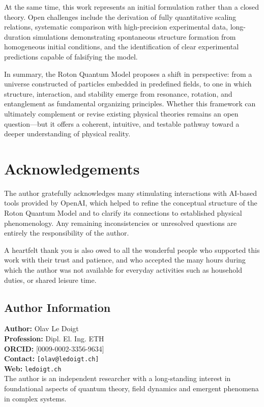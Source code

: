 \documentclass[11pt,a4paper]{article}
\begin{document}
At the same time, this work represents an initial formulation rather than a closed theory. Open challenges include the derivation of fully quantitative scaling relations, systematic comparison with high-precision experimental data, long-duration simulations demonstrating spontaneous structure formation from homogeneous initial conditions, and the identification of clear experimental predictions capable of falsifying the model.

In summary, the Roton Quantum Model proposes a shift in perspective: from a universe constructed of particles embedded in predefined fields, to one in which structure, interaction, and stability emerge from resonance, rotation, and entanglement as fundamental organizing principles. Whether this framework can ultimately complement or revise existing physical theories remains an open question—but it offers a coherent, intuitive, and testable pathway toward a deeper understanding of physical reality.


\section*{Acknowledgements}

The author gratefully acknowledges many stimulating interactions with AI-based tools provided by OpenAI, which helped to refine the conceptual structure of the Roton Quantum Model and to clarify its connections to established physical phenomenology. Any remaining inconsistencies or unresolved questions are entirely the responsibility of the author. 

A heartfelt thank you is also owed to all the wonderful people who supported this work with their trust and patience, and who accepted the many hours during which the author was not available for everyday activities such as household duties, or shared leisure time.

\subsection*{Author Information}
\textbf{Author:} Olav Le Doigt \\
\textbf{Profession:} Dipl. El. Ing. ETH\\
\textbf{ORCID:} [0009-0002-3356-9634] \\
\textbf{Contact:} \texttt{[olav@ledoigt.ch]} \\
\textbf{Web:} \texttt{ledoigt.ch} \\[0.5em]
The author is an independent researcher with a long-standing interest in foundational aspects 
of quantum theory, field dynamics and emergent phenomena in complex systems.
\end{document}
